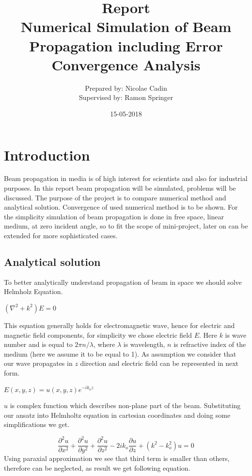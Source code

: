 \documentclass[a4paper]{article}
\title{Report\\Numerical Simulation of Beam Propagation including Error Convergence Analysis}
\date{15-05-2018}
\author{Prepared by: Nicolae Cadin \\Supervised by: Ramon Springer}
\begin{document}
	
	
	\maketitle
	\newpage
	\tableofcontents	

	
	\newpage
	\section{Introduction}
	Beam propagation in media is of high interest for scientists and also for industrial purposes. 
	In this report beam propagation will be simulated, problems will be discussed. The purpose of the project is to compare numerical method and analytical solution. Convergence of used numerical method is to be shown. For the simplicity simulation of beam propagation is done in free space, linear medium, at zero incident angle, so to fit the scope of mini-project, later on can be extended for more sophisticated cases.
	\subsection{Analytical solution}
	To better analytically understand propagation of beam in space we should solve Helmholz Equation.
	\begin{center}
		$(\nabla^2+k^2)E = 0$		
	\end{center}
	This equation generally holds for electromagnetic wave, hence for electric and magnetic field components, for simplicity we chose electric field $E$. Here $k$ is wave number and is equal to $2\pi n/\lambda$, where $\lambda$ is wavelength, $n$ is refractive index of the medium (here we assume it to be equal to 1). As assumption we consider that our wave propagates in $z$ direction and electric field can be represented in next form.
	\begin{center}
		$E(x,y,z)=u(x,y,z)e^{-ik_oz}$
	\end{center}
	$u$ is complex function which describes non-plane part of the beam. Substituting our ansatz into Helmholtz equation in cartesian coordinates and doing some simplifications we get.

	\[\frac{\partial^2 u}{\partial x^2}+ \frac{\partial^2 u}{\partial y^2}+ \frac{\partial^2 u}{\partial z^2} - 2ik_o\frac{\partial u}{\partial z}+(k^2-k_o^2)u=0\]
	Using paraxial approximation we see that third term is smaller than others, therefore can be neglected, as result we get following equation.
	
\end{document}
